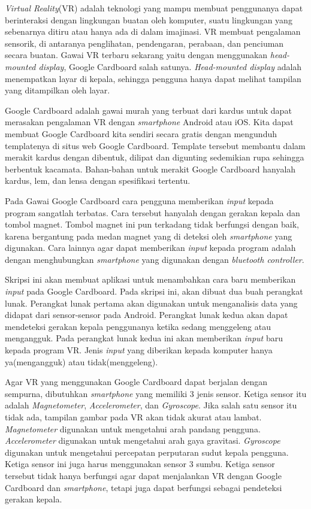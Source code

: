 \documentclass[a4paper,twoside]{article}
\begin{document}
\begin{enumerate}
\textit{Virtual Reality}(VR) adalah teknologi yang mampu membuat penggunanya dapat berinteraksi dengan lingkungan buatan oleh komputer, suatu lingkungan yang sebenarnya ditiru atau hanya ada di dalam imajinasi.\cite{parisi_2015} VR membuat pengalaman sensorik, di antaranya penglihatan, pendengaran, perabaan, dan penciuman secara buatan.\cite{kim_2005} Gawai VR terbaru sekarang yaitu dengan menggunakan \textit{head-mounted display}, Google Cardboard salah satunya. \textit{Head-mounted display} adalah menempatkan layar di kepala, sehingga pengguna hanya dapat melihat tampilan yang ditampilkan oleh layar.\cite{vince_2004}

Google Cardboard\cite{googlevr} adalah gawai murah yang terbuat dari kardus untuk dapat merasakan pengalaman VR dengan \textit{smartphone} Android atau iOS. Kita dapat membuat Google Cardboard kita sendiri secara gratis dengan mengunduh templatenya di situs web Google Cardboard. \cite{googlevr}Template tersebut membantu dalam merakit kardus dengan dibentuk, dilipat dan digunting sedemikian rupa sehingga berbentuk kacamata. Bahan-bahan untuk merakit Google Cardboard hanyalah kardus, lem, dan lensa dengan spesifikasi tertentu.

Pada Gawai Google Cardboard cara pengguna memberikan \textit{input} kepada program sangatlah terbatas. Cara tersebut hanyalah dengan gerakan kepala dan tombol magnet. Tombol magnet ini pun terkadang tidak berfungsi dengan baik, karena bergantung pada medan magnet yang di deteksi oleh \textit{smartphone} yang digunakan. Cara lainnya agar dapat memberikan \textit{input} kepada program adalah dengan menghubungkan \textit{smartphone} yang digunakan dengan \textit{bluetooth controller}. 

Skripsi ini akan membuat aplikasi untuk menambahkan cara baru  memberikan \textit{input} pada Google Cardboard. Pada skripsi ini, akan dibuat dua buah perangkat lunak. Perangkat lunak pertama akan digunakan untuk menganalisis data yang didapat dari sensor-sensor pada Android. Perangkat lunak kedua akan dapat mendeteksi gerakan kepala penggunanya ketika sedang menggeleng atau mengangguk. Pada perangkat lunak kedua ini akan memberikan \textit{input} baru kepada program VR. Jenis \textit{input} yang diberikan kepada komputer hanya ya(mengangguk) atau tidak(menggeleng).

Agar VR yang menggunakan Google Cardboard dapat berjalan dengan sempurna, dibutuhkan \textit{smartphone} yang memiliki 3 jenis sensor. Ketiga sensor itu adalah \textit{Magnetometer}, \textit{Accelerometer}, dan \textit{Gyroscope}.\cite{android_open_source_project} Jika salah satu sensor itu tidak ada, tampilan gambar pada VR akan tidak akurat atau lambat. \textit{Magnetometer} digunakan untuk mengetahui arah pandang pengguna. \textit{Accelerometer} digunakan untuk mengetahui arah gaya gravitasi.\cite{bleser2009advanced} \textit{Gyroscope} digunakan untuk mengetahui percepatan perputaran sudut kepala pengguna. Ketiga sensor ini juga harus menggunakan sensor 3 sumbu. Ketiga sensor tersebut tidak hanya berfungsi agar dapat menjalankan VR dengan Google Cardboard dan \textit{smartphone}, tetapi juga dapat berfungsi sebagai pendeteksi gerakan kepala.


\end{enumerate}
\end{document}
